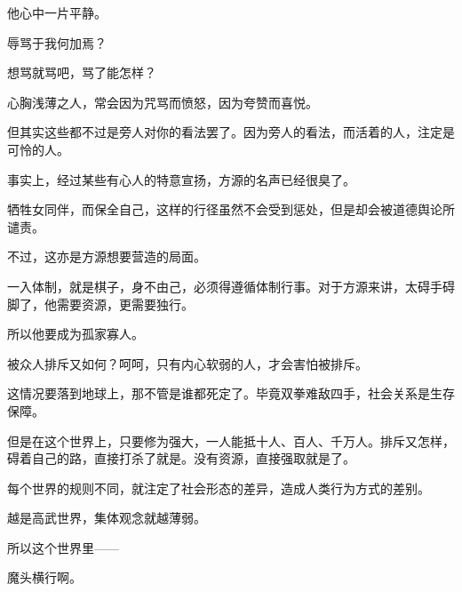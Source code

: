 \begin{this_body}
他心中一片平静。

辱骂于我何加焉？

想骂就骂吧，骂了能怎样？

心胸浅薄之人，常会因为咒骂而愤怒，因为夸赞而喜悦。

但其实这些都不过是旁人对你的看法罢了。因为旁人的看法，而活着的人，注定是可怜的人。

事实上，经过某些有心人的特意宣扬，方源的名声已经很臭了。

牺牲女同伴，而保全自己，这样的行径虽然不会受到惩处，但是却会被道德舆论所谴责。

不过，这亦是方源想要营造的局面。

一入体制，就是棋子，身不由己，必须得遵循体制行事。对于方源来讲，太碍手碍脚了，他需要资源，更需要独行。

所以他要成为孤家寡人。

被众人排斥又如何？呵呵，只有内心软弱的人，才会害怕被排斥。

这情况要落到地球上，那不管是谁都死定了。毕竟双拳难敌四手，社会关系是生存保障。

但是在这个世界上，只要修为强大，一人能抵十人、百人、千万人。排斥又怎样，碍着自己的路，直接打杀了就是。没有资源，直接强取就是了。

每个世界的规则不同，就注定了社会形态的差异，造成人类行为方式的差别。

越是高武世界，集体观念就越薄弱。

所以这个世界里——

魔头横行啊。

\end{this_body}

